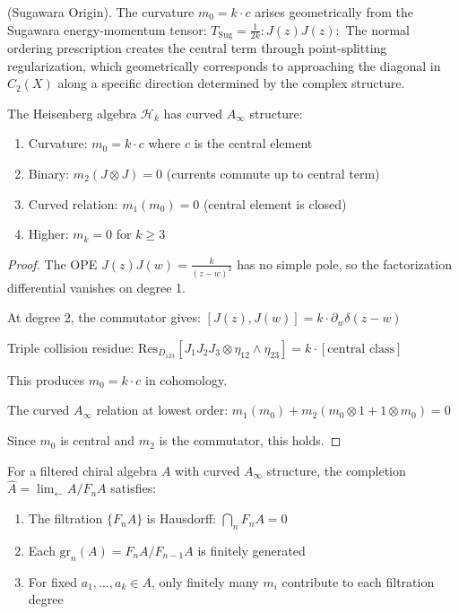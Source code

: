 \begin{remark} (Sugawara Origin). The curvature $m_0 = k \cdot c$ arises geometrically from the Sugawara energy-momentum tensor:
$T_{\text{Sug}} = \frac{1}{2k} :J(z)J(z):$
The normal ordering prescription creates the central term through point-splitting regularization, which geometrically corresponds to approaching the diagonal in $C_2(X)$ along a specific direction determined by the complex structure.
\end{remark}

\begin{theorem}
The Heisenberg algebra $\mathcal{H}_k$ has curved $A_\infty$ structure:
\begin{enumerate}
\item Curvature: $m_0 = k \cdot c$ where $c$ is the central element
\item Binary: $m_2(J \otimes J) = 0$ (currents commute up to central term)
\item Curved relation: $m_1(m_0) = 0$ (central element is closed)
\item Higher: $m_k = 0$ for $k \geq 3$ 
\end{enumerate}
\end{theorem}

\begin{proof}
The OPE $J(z)J(w) = \frac{k}{(z-w)^2}$ has no simple pole, so the factorization differential vanishes on degree 1.

At degree 2, the commutator gives:
$[J(z), J(w)] = k \cdot \partial_w\delta(z-w)$

Triple collision residue:
$\text{Res}_{D_{123}}[J_1 J_2 J_3 \otimes \eta_{12} \wedge \eta_{23}] = k \cdot [\text{central class}]$

This produces $m_0 = k \cdot c$ in cohomology.

The curved $A_\infty$ relation at lowest order:
$m_1(m_0) + m_2(m_0 \otimes 1 + 1 \otimes m_0) = 0$

Since $m_0$ is central and $m_2$ is the commutator, this holds.
\end{proof}

\begin{proposition}\label{prop:curved-convergence}
For a filtered chiral algebra $A$ with curved $A_\infty$ structure, the completion $\hat{A} = \lim_{\leftarrow} A/F_nA$ satisfies:
\begin{enumerate}
\item The filtration $\{F_nA\}$ is Hausdorff: $\bigcap_n F_nA = 0$
\item Each $\text{gr}_n(A) = F_nA/F_{n-1}A$ is finitely generated
\item For fixed $a_1, \ldots, a_k \in A$, only finitely many $m_i$ contribute to each filtration degree
\end{enumerate}
\end{proposition}

